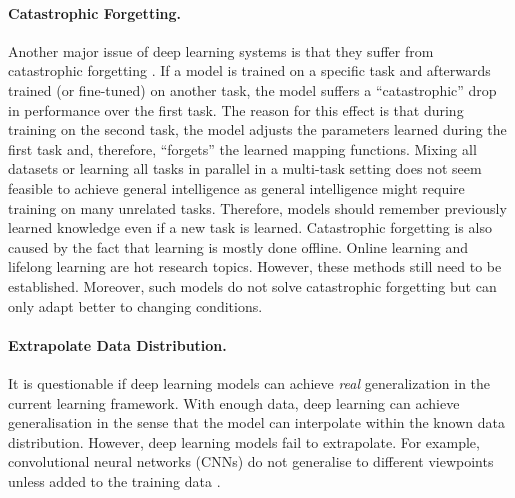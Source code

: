 \paragraph{Catastrophic Forgetting.} Another major issue of deep learning systems is that they suffer from catastrophic forgetting \cite{kirkpatrick_overcoming_2017, liu_overcoming_2021}.
If a model is trained on a specific task and afterwards trained (or fine-tuned) on another task, the model suffers a ``catastrophic'' drop in performance over the first task.
The reason for this effect is that during training on the second task, the model adjusts the parameters learned during the first task and, therefore, ``forgets'' the learned mapping functions.
Mixing all datasets or learning all tasks in parallel in a multi-task setting \cite{zhang_survey_2022} does not seem feasible to achieve general intelligence as general intelligence might require training on many unrelated tasks. Therefore, models should remember previously learned knowledge even if a new task is learned.
Catastrophic forgetting is also caused by the fact that learning is mostly done offline.
Online learning \cite{sahoo_online_2018} and lifelong learning \cite{parisi_continual_2019} are hot research topics.
However, these methods still need to be established. Moreover, such models do not solve catastrophic forgetting but can only adapt better to changing conditions.

\paragraph{Extrapolate Data Distribution.} It is questionable if deep learning models can achieve \emph{real} generalization in the current learning framework.
With enough data, deep learning can achieve generalisation in the sense that the model can interpolate within the known data distribution.
However, deep learning models fail to extrapolate.
For example, convolutional neural networks (CNNs) do not generalise to different viewpoints unless added to the training data .

